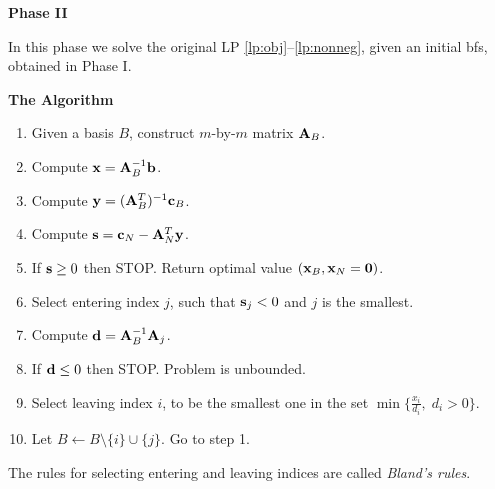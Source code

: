 \documentclass[10pt]{article}
\begin{document}
\medskip
{\bf Phase II}

In this phase we solve the original LP \eqref{lp:obj}--\eqref{lp:nonneg}, given an initial bfs, obtained in Phase I.

\medskip
{\bf The Algorithm}
\begin{enumerate}
	\item Given a basis $B$, construct $m$-by-$m$ matrix ${\bf A}_B$.
	\item Compute ${\bf x} = {\bf A}_B^{-1} {\bf b}$.
	\item Compute ${\bf y} = ({\bf A}_B^T)^{-1} {\bf c}_B$.
	\item Compute ${\bf s} = {\bf c}_N - {\bf A}_N^T {\bf y}$.
	\item If ${\bf s} \geq 0$ then STOP. Return optimal value $({\bf x}_B, {\bf x}_N = {\bf 0})$.
	\item Select entering index $j$, such that ${\bf s}_j < 0$ and $j$ is the smallest.
	\item Compute ${\bf d} = {\bf A}_B^{-1} {\bf A}_j$. 
	\item If ${\bf d} \leq 0$ then STOP. Problem is unbounded.
	\item Select leaving index $i$, to be the smallest one in the set $\min \{ \frac{x_i}{d_i}, \; d_i > 0 \}$.
	\item Let $B \leftarrow B \setminus \{ i \} \cup \{ j \}$. Go to step 1.
\end{enumerate}

The rules for selecting entering and leaving indices are called {\em Bland's rules}.
\end{document}
